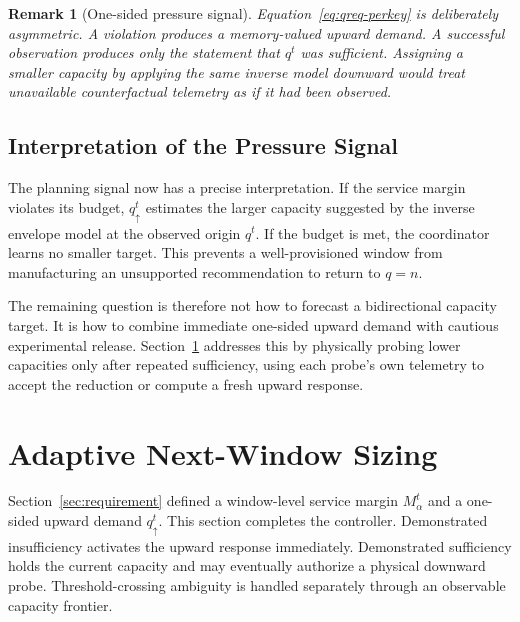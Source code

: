 \documentclass[sigconf, nonacm]{acmart}
\newtheorem{remark}{Remark}
\begin{document}
\begin{remark}[One-sided pressure signal]
\label{rem:req-surrogate}
Equation~\eqref{eq:qreq-perkey} is deliberately asymmetric. A violation produces a memory-valued upward demand. A successful observation produces only the statement that \(q^t\) was sufficient. Assigning a smaller capacity by applying the same inverse model downward would treat unavailable counterfactual telemetry as if it had been observed.
\end{remark}

\subsection{Interpretation of the Pressure Signal}
\label{subsec:req-interpretation}

The planning signal now has a precise interpretation. If the service margin violates its budget, \(q_\uparrow^t\) estimates the larger capacity suggested by the inverse envelope model at the observed origin \(q^t\). If the budget is met, the coordinator learns no smaller target. This prevents a well-provisioned window from manufacturing an unsupported recommendation to return to \(q=n\).

The remaining question is therefore not how to forecast a bidirectional capacity target. It is how to combine immediate one-sided upward demand with cautious experimental release. Section~\ref{sec:predictive} addresses this by physically probing lower capacities only after repeated sufficiency, using each probe's own telemetry to accept the reduction or compute a fresh upward response.



\section{Adaptive Next-Window Sizing}
\label{sec:predictive}

Section~\ref{sec:requirement} defined a window-level service margin \(M_\alpha^t\) and a one-sided upward demand \(q_\uparrow^t\). This section completes the controller. Demonstrated insufficiency activates the upward response immediately. Demonstrated sufficiency holds the current capacity and may eventually authorize a physical downward probe. Threshold-crossing ambiguity is handled separately through an observable capacity frontier.
\end{document}
